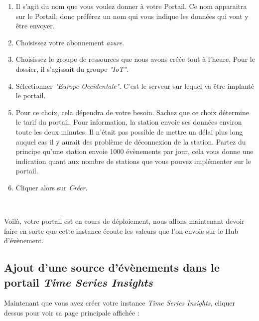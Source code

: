\begin{enumerate}
\begin{enumerate}
	\item Il s'agit du nom que vous voulez donner à votre Portail. Ce nom apparaitra sur le Portail, donc préférez un nom qui vous indique les données qui vont y être envoyer.
	
	\item Choisissez votre abonnement \textit{azure}.
	
	\item Choisissez le groupe de ressources que nous avons créée tout à l'heure. Pour le dossier, il s'agissait du groupe \textit{"IoT"}.
	\item Sélectionner \textit{"Europe Occidentale"}. C'est le serveur sur lequel va être implanté le portail.
	
	\item Pour ce choix, cela dépendra de votre besoin. Sachez que ce choix détermine le tarif du portail. Pour information, la station envoie ses données environ toute les deux minutes. Il n'était pas possible de mettre un délai plus long auquel cas il y aurait des problème de déconnexion de la station. Partez du principe qu'une station envoie 1000 évènements par jour, cela vous donne une indication quant aux nombre de stations que vous pouvez implémenter sur le portail.
	\item Cliquer alors sur \textit{Créer}.
	
\end{enumerate} \\
\end{enumerate}

Voilà, votre portail est en cours de déploiement, nous allons maintenant devoir faire en sorte que cette instance écoute les valeurs que l'on envoie sur le Hub d'évènement.

\subsection{Ajout d'une source d'évènements dans le portail \textit{Time Series Insights}}

Maintenant que vous avez créer votre instance \textit{Time Series Insights}, cliquer dessus pour voir sa page principale affichée :\\

